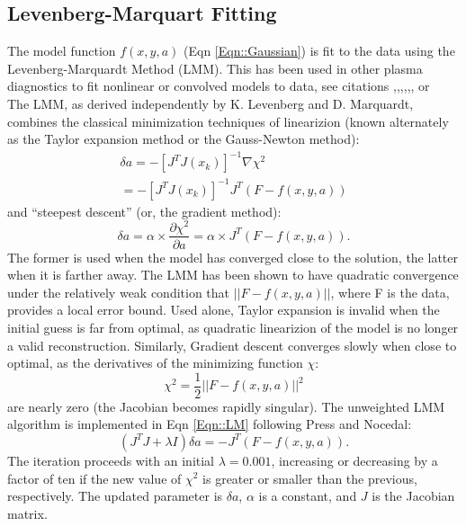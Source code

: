 \subsection{Levenberg-Marquart Fitting}\label{sec::LM}
\hspace*{4ex}The model function $f(x,y,a)$ (Eqn \ref{Eqn::Gaussian}) is fit to the data using the Levenberg-Marquardt Method (LMM). This has been used in other plasma diagnostics to fit nonlinear or convolved models to data, see citations \cite{Nikolić200167},\cite{Heesterman},\cite{Avdeeva},\cite{Pablant},\cite{Reinke},\cite{Luxon}, or \cite{Lazerson}\\
\hspace*{4ex}The LMM, as derived independently by K. Levenberg\cite{LEVENBERG} and D. Marquardt\cite{marquardt1963algorithm}, combines the classical minimization techniques of linearizion (known alternately as the Taylor expansion method or the Gauss-Newton method):
\begin{eqnarray}\label{Eqn::G-N}
\delta{a} = -[J^TJ(x_k)]^{-1}\nabla{\chi^2} \nonumber\\ = -[J^TJ(x_k)]^{-1}{J^T}(F-f(x,y,a))
\end{eqnarray} 
and ``steepest descent'' (or, the gradient method):
\begin{equation}\label{Eqn::Grad}
\delta{a} = \alpha\times\frac{\partial\chi^2}{\partial{a}} = \alpha\times{J^T}(F-f(x,y,a)).
\end{equation}
The former is used when the model has converged close to the solution, the latter when it is farther away. The LMM has been shown to have quadratic convergence\cite{Fan2005} under the relatively weak condition that $||F-f(x,y,a)||$, where F is the data, provides a local error bound. Used alone, Taylor expansion is invalid when the initial guess is far from optimal, as quadratic linearizion of the model is no longer a valid reconstruction. Similarly, Gradient descent converges slowly when close to optimal, as the derivatives of the minimizing function $\chi$:
\begin{equation}\label{Eqn::Chi}
\chi^2 = \frac{1}{2}||F-f(x,y,a)||^2
\end{equation}
 are nearly zero (the Jacobian becomes rapidly singular). The unweighted LMM algorithm is implemented in Eqn \ref{Eqn::LM} following Press\cite{press1996numerical} and Nocedal\cite{nocedal2006numerical}:\\
\begin{equation}\label{Eqn::LM}
(J^TJ+\lambda{I})\delta{a}=-J^T(F-f(x,y,a)).
\end{equation}
The iteration proceeds with an initial $\lambda=0.001$, increasing or decreasing by a factor of ten if the new value of $\chi^2$ is greater or smaller than the previous, respectively. The updated parameter is $\delta{a}$, $\alpha$ is a constant, and $J$ is the Jacobian matrix. 

